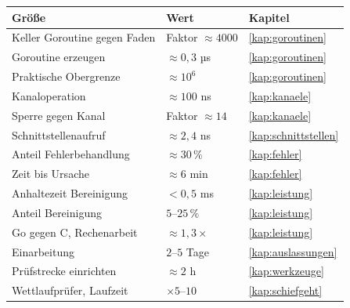 \begin{merksatz}
\begin{center}
{\small
\renewcommand{\arraystretch}{1.42}
\begin{tabular}{@{}P{4.0cm}P{2.2cm}P{2.4cm}@{}}
\toprule
\textbf{Größe} & \textbf{Wert} & \textbf{Kapitel}\\
\midrule
Keller Goroutine gegen Faden & Faktor $\approx4000$ & \ref{kap:goroutinen}\\
Goroutine erzeugen & $\approx0{,}3$ µs & \ref{kap:goroutinen}\\
Praktische Obergrenze & $\approx10^6$ & \ref{kap:goroutinen}\\
Kanaloperation & $\approx100$ ns & \ref{kap:kanaele}\\
Sperre gegen Kanal & Faktor $\approx14$ & \ref{kap:kanaele}\\
Schnittstellenaufruf & $\approx2{,}4$ ns & \ref{kap:schnittstellen}\\
Anteil Fehlerbehandlung & $\approx30\,\%$ & \ref{kap:fehler}\\
Zeit bis Ursache & $\approx6$ min & \ref{kap:fehler}\\
Anhaltezeit Bereinigung & $<0{,}5$ ms & \ref{kap:leistung}\\
Anteil Bereinigung & $5$--$25\,\%$ & \ref{kap:leistung}\\
Go gegen C, Rechenarbeit & $\approx1{,}3\times$ & \ref{kap:leistung}\\
Einarbeitung & $2$--$5$ Tage & \ref{kap:auslassungen}\\
Prüfstrecke einrichten & $\approx2$ h & \ref{kap:werkzeuge}\\
Wettlaufprüfer, Laufzeit & $\times5$--$10$ & \ref{kap:schiefgeht}\\
\bottomrule
\end{tabular}}
\end{center}

\begin{center}
\begin{minipage}{0.88\textwidth}
\end{minipage}
\end{center}
\end{merksatz}

